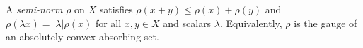 A \emph{semi-norm} $\rho$ on $X$ satisfies $\rho(x+y) \leqslant \rho(x) + \rho(y)$ and $\rho(\lambda x) = |\lambda|\rho(x)$ for all $x,y \in X$ and scalars $\lambda$. Equivalently, $\rho$ is the gauge of an absolutely convex absorbing set.
